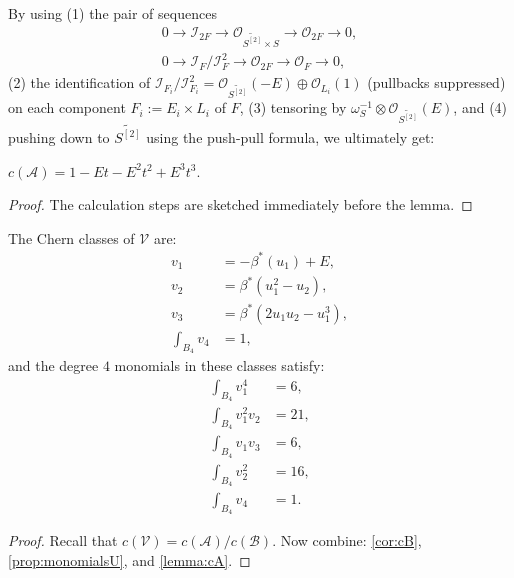 \documentclass[12pt,reqno]{amsart}
\renewcommand{\to}{{\longrightarrow}}
\numberwithin{equation}{section}
\renewcommand{\O}{\mathcal O}
\newcommand{\td}{\widetilde}
\newcommand{\V}{\mathcal V}
\begin{document}
By using (1) the pair of sequences
\begin{align}
  \label{eq:seqA}
  0 \to \mathcal{I}_{2F} \to \O_{\td{S^{[2]}} \times S} \to \O_{2F} \to 0,\\
  0 \to \mathcal{I}_{F}/\mathcal{I}_{F}^{2} \to \O_{2F} \to \O_{F} \to 0,
\end{align}
(2) the identification of
$\mathcal{I}_{F_{i}}/\mathcal{I}_{F_{i}}^{2} = \O_{\td{S^{[2]}}}(-E)
\oplus \O_{L_{i}}(1)$ (pullbacks suppressed) on each component
$F_{i} := E_{i} \times L_{i}$ of $F$, (3) tensoring by
$\omega_{S}^{-1} \otimes \O_{\td{S^{[2]}}}(E)$, and (4) pushing down
to $\td{S^{[2]}}$ using the push-pull formula, we ultimately get:

\begin{lemma}
  \label{lemma:cA} $c(\mathcal{A}) = 1 - Et-E^{2}t^{2}+E^{3}t^{3} .$
\end{lemma}

\begin{proof}
  The calculation steps are sketched immediately before the lemma.
\end{proof}

\begin{corollary}
  \label{cor:cV4} The Chern classes of $\V$ are:
  \begin{align}
    \label{eq:cV4}
    v_{1} &= -\beta^{*}(u_{1}) + E,\\ \nonumber
    v_{2} &= \beta^{*}\left(u_{1}^{2} - u_{2}\right),\\\nonumber
    v_{3} &= \beta^{*}\left( 2u_{1}u_{2} - u_{1}^{3} \right),\\\nonumber
    \int_{B_{4}} v_{4} &= 1,\nonumber
  \end{align}
  and the degree $4$ monomials in these classes satisfy:
  \begin{align}
    \label{eq:monomialsV4}
    \int_{B_{4}} v_{1}^{4} &= 6,\\\nonumber
    \int_{B_{4}} v_{1}^{2}v_{2} &= 21,\\\nonumber
    \int_{B_{4}} v_{1}v_{3} &= 6, \\\nonumber
    \int_{B_{4}} v_{2}^{2} &= 16, \\\nonumber
    \int_{B_{4}} v_{4} &= 1.\nonumber
  \end{align}
\end{corollary}

\begin{proof}
  Recall that $c(\V) = c(\mathcal{A})/c(\mathcal{B})$.  Now combine:
  \autoref{cor:cB}, \autoref{prop:monomialsU}, and \autoref{lemma:cA}.
\end{proof}
\end{document}
